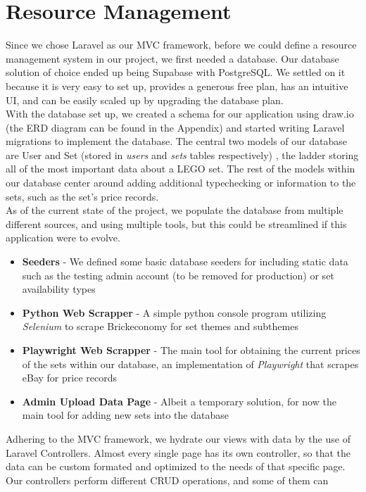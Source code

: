 \section{Resource Management}

Since we chose Laravel as our MVC framework, before we could define a resource management system in our project, we first needed a database.
Our database solution of choice ended up being Supabase with PostgreSQL. We settled on it because it is very easy to set up, provides a generous
free plan, has an intuitive UI, and can be easily scaled up by upgrading the database plan.\\
With the database set up, we created a schema for our application using draw.io (the ERD diagram can be found in the Appendix) and started writing Laravel 
migrations to implement the database. The central two models of our database are User and Set (stored in \textit{users} and \textit{sets} tables respectively)
, the ladder storing all of the most important data about a LEGO set.
The rest of the models within our database center around adding additional typechecking or information to the sets, such as the set's price records.\\
As of the current state of the project, we populate the database from multiple different sources, and using multiple tools, but this could be streamlined 
if this application were to evolve.
\begin{itemize}
    \item \textbf{Seeders} - We defined some basic database seeders for including static data such as the testing admin account (to be removed for production) or set availability types
    \item \textbf{Python Web Scrapper} - A simple python console program utilizing \textit{Selenium} to scrape Brickeconomy for set themes and subthemes
    \item \textbf{Playwright Web Scrapper} - The main tool for obtaining the current prices of the sets within our database, an implementation of \textit{Playwright} that scrapes eBay for price records
    \item \textbf{Admin Upload Data Page} - Albeit a temporary solution, for now the main tool for adding new sets into the database 
\end{itemize}
Adhering to the MVC framework, we hydrate our views with data by the use of Laravel Controllers. Almost every single page has its own controller, so
that the data can be custom formated and optimized to the needs of that specific page. Our controllers perform different CRUD operations, and some of them can
